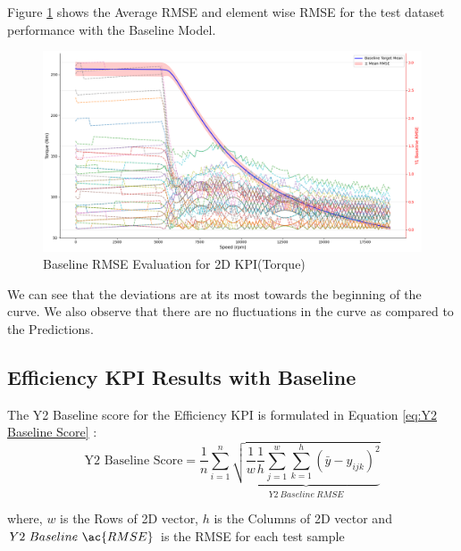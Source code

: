 \documentclass{report} %
\begin{document}
Figure \ref{fig:Baseline RMSE Evaluation for 2D KPI(Torque)} shows the Average \ac{RMSE} and element wise \ac{RMSE} for the test dataset performance with the Baseline Model.\\

\begin{figure}[H]
    \centering
    \includegraphics[width=1\textwidth]{./ReportImages/RMSE_Baseline_y1.png} 
    \caption{Baseline \ac{RMSE} Evaluation for 2D KPI(Torque)} 
    \label{fig:Baseline RMSE Evaluation for 2D KPI(Torque)}
\end{figure}

We can see that the deviations are at its most towards the beginning of the curve. 
We also observe that there are no fluctuations in the curve as compared to the Predictions.\\

\subsection{Efficiency \ac{KPI} Results with Baseline}\label{sec:3D Efficiency Grid Results with Baseline}

The Y2 Baseline score for the Efficiency \ac{KPI} is formulated in Equation \ref{eq:Y2 Baseline Score} :
\begin{equation}
    \text{Y2 Baseline Score} = \frac{1}{n} \sum_{i=1}^{n} \underbrace{ \sqrt{\frac{1}{w} \frac{1}{h} \sum_{j=1}^{w} \sum_{k=1}^{h} (\bar{y} - y_{ijk})^2}}_{Y2\ Baseline\ RMSE}
    \label{eq:Y2 Baseline Score}
\end{equation}
    
where, \(w\) is the Rows of \ac{2D} vector, \(h\) is the Columns of \ac{2D} vector and \(Y2\ Baseline\ \ac{RMSE}\) is the \ac{RMSE} for each test sample
\end{document}
